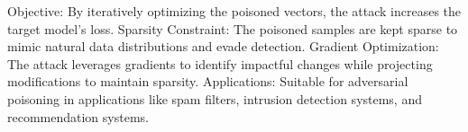 Objective: By iteratively optimizing the poisoned vectors, the attack increases the target model's loss.
Sparsity Constraint: The poisoned samples are kept sparse to mimic natural data distributions and evade detection.
Gradient Optimization: The attack leverages gradients to identify impactful changes while projecting modifications to maintain sparsity.
Applications: Suitable for adversarial poisoning in applications like spam filters, intrusion detection systems, and recommendation systems.


